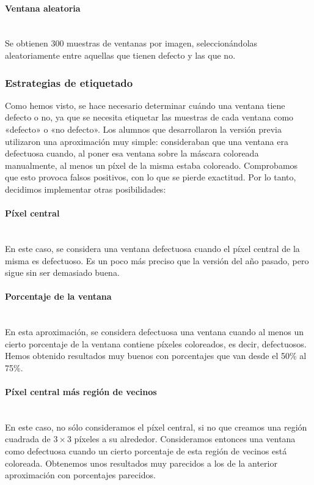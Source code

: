 \paragraph*{Ventana aleatoria}\mbox{} \\
\indent Se obtienen 300 muestras de ventanas por imagen, seleccionándolas aleatoriamente entre aquellas que tienen defecto y las que no.

\subsubsection{Estrategias de etiquetado}
Como hemos visto, se hace necesario determinar cuándo una ventana tiene defecto o no, ya que se necesita etiquetar las muestras de cada ventana como «defecto» o «no defecto». Los alumnos que desarrollaron la versión previa utilizaron una aproximación muy simple: consideraban que una ventana era defectuosa cuando, al poner esa ventana sobre la máscara coloreada manualmente, al menos un píxel de la misma estaba coloreado. Comprobamos que esto provoca falsos positivos, con lo que se pierde exactitud. Por lo tanto, decidimos implementar otras posibilidades:

\paragraph*{Píxel central}\mbox{} \\
\indent En este caso, se considera una ventana defectuosa cuando el píxel central de la misma es defectuoso. Es un poco más preciso que la versión del año pasado, pero sigue sin ser demasiado buena.

\paragraph*{Porcentaje de la ventana}\mbox{} \\
\indent En esta aproximación, se considera defectuosa una ventana cuando al menos un cierto porcentaje de la ventana contiene píxeles coloreados, es decir, defectuosos. Hemos obtenido resultados muy buenos con porcentajes que van desde el 50\% al 75\%.

\paragraph*{Píxel central más región de vecinos}\mbox{} \\
\indent En este caso, no sólo consideramos el píxel central, si no que creamos una región cuadrada de $3 \times 3$ píxeles a su alrededor. Consideramos entonces una ventana como defectuosa cuando un cierto porcentaje de esta región de vecinos está coloreada. Obtenemos unos resultados muy parecidos a los de la anterior aproximación con porcentajes parecidos.


